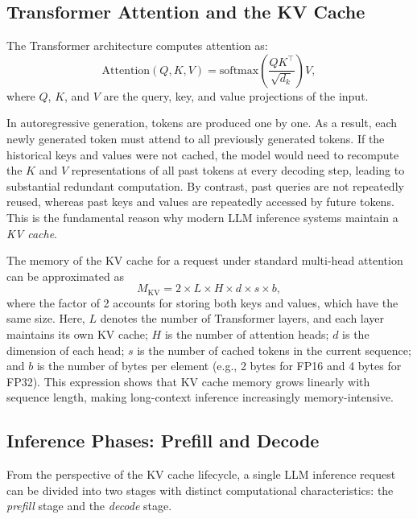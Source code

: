 \documentclass[10pt, a4paper]{article}
\begin{document}
\subsection{Transformer Attention and the KV Cache}

The Transformer architecture \cite{vaswani2017attention} computes attention as:
\begin{equation}
    \text{Attention}(Q, K, V)
    = \text{softmax}\!\left(\frac{QK^\top}{\sqrt{d_k}}\right)V,
    \label{eq:attention}
\end{equation}
where $Q$, $K$, and $V$ are the query, key, and value projections of the input.

In autoregressive generation, tokens are produced one by one. As a result,
each newly generated token must attend to all previously generated tokens. If
the historical keys and values were not cached, the model would need to
recompute the $K$ and $V$ representations of all past tokens at every decoding
step, leading to substantial redundant computation. By contrast, past queries
are not repeatedly reused, whereas past keys and values are repeatedly accessed
by future tokens. This is the fundamental reason why modern LLM inference
systems maintain a \emph{KV cache}.

The memory of the KV cache for a request under standard multi-head
attention can be approximated as
\begin{equation}
    M_{\text{KV}} = 2 \times L \times H \times d \times s \times b,
    \label{eq:kvcost}
\end{equation}
where the factor of 2 accounts for storing both keys and values, which have the
same size. Here, $L$ denotes the number of Transformer layers, and each layer
maintains its own KV cache; $H$ is the number of attention heads; $d$ is the
dimension of each head; $s$ is the number of cached tokens in the current
sequence; and $b$ is the number of bytes per element (e.g., 2 bytes for FP16
and 4 bytes for FP32). This expression shows that KV cache memory grows
linearly with sequence length, making long-context inference increasingly
memory-intensive.\cite{pope2022scaling}

\subsection{Inference Phases: Prefill and Decode}

From the perspective of the KV cache lifecycle, a single LLM inference request
can be divided into two stages with distinct computational characteristics:
the \emph{prefill} stage and the \emph{decode} stage.
\end{document}
